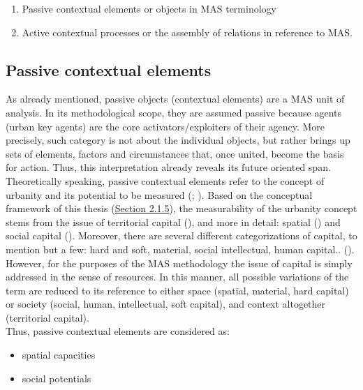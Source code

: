 \documentclass[11pt]{report}
\begin{document}
\begin{enumerate}
\item Passive contextual elements or objects in MAS terminology
\item Active contextual processes or the assembly of relations in reference to MAS.
\end{enumerate}

\subsection{Passive contextual elements}

As already mentioned, passive objects (contextual elements) are a MAS unit of analysis.
In its methodological scope, they are assumed passive because agents (urban key agents) are the core activators/exploiters of their agency.
More precisely, such category is not about the individual objects, but rather brings up sets of elements, factors and circumstances that, once united, become the basis for action. Thus, this interpretation already reveals its future oriented span. 
\\

Theoretically speaking, passive contextual elements refer to the concept of urbanity and its potential to be measured (\cite{Marcus2007}; \cite{Vujosevic2010}).
Based on the conceptual framework of this thesis (\href{Section 2.1.5}{Section 2.1.5}),
the measurability of the urbanity concept stems from the issue of territorial capital (\cite{Camagni and Capello 2012}), and more in detail: spatial (\cite{Marcus2007}) and social capital (\cite{Golubovic2007}).
Moreover, there are several different categorizations of capital, to mention but a few: hard and soft, material, social intellectual, human capital.. (\cite{Healey 1997}). %
\\

However, for the purposes of the MAS methodology the issue of capital is simply addressed in the sense of resources.
In this manner, all possible variations of the term are reduced to its reference to either space (spatial, material, hard capital) or society (social, human, intellectual, soft capital), and context altogether (territorial capital).
\\

Thus, passive contextual elements are considered as:
\begin{itemize}
\item spatial capacities
\item social potentials
\end{itemize}
\end{document}
